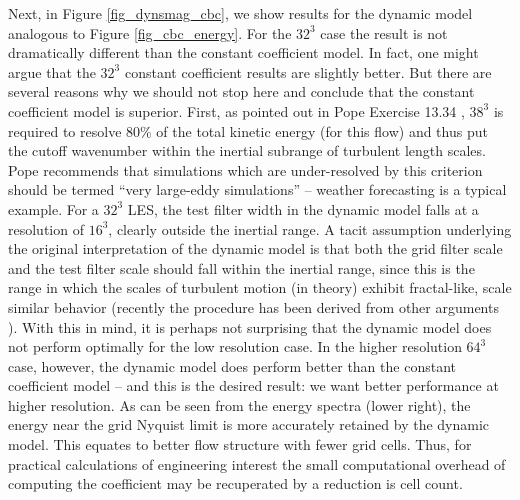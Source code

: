 \documentclass[11pt]{book}
\begin{document}
Next, in Figure \ref{fig_dynsmag_cbc}, we show results for the dynamic model analogous to Figure \ref{fig_cbc_energy}.  For the $32^3$ case the result is not dramatically different than the constant coefficient model.  In fact, one might argue that the $32^3$ constant coefficient results are slightly better.  But there are several reasons why we should not stop here and conclude that the constant coefficient model is superior.  First, as pointed out in Pope Exercise 13.34 \cite{Pope:2000}, $38^3$ is required to resolve 80\% of the total kinetic energy (for this flow) and thus put the cutoff wavenumber within the inertial subrange of turbulent length scales.  Pope recommends that simulations which are under-resolved by this criterion should be termed ``very large-eddy simulations'' -- weather forecasting is a typical example.  For a $32^3$ LES, the test filter width in the dynamic model falls at a resolution of $16^3$, clearly outside the inertial range.  A tacit assumption underlying the original interpretation of the dynamic model is that both the grid filter scale and the test filter scale should fall within the inertial range, since this is the range in which the scales of turbulent motion (in theory) exhibit fractal-like, scale similar behavior (recently the procedure has been derived from other arguments \cite{Pope:2004}).  With this in mind, it is perhaps not surprising that the dynamic model does not perform optimally for the low resolution case.  In the higher resolution $64^3$ case, however, the dynamic model does perform better than the constant coefficient model -- and this is the desired result: we want better performance at higher resolution.  As can be seen from the energy spectra (lower right), the energy near the grid Nyquist limit is more accurately retained by the dynamic model.  This equates to better flow structure with fewer grid cells.  Thus, for practical calculations of engineering interest the small computational overhead of computing the coefficient may be recuperated by a reduction is cell count.
\end{document}
